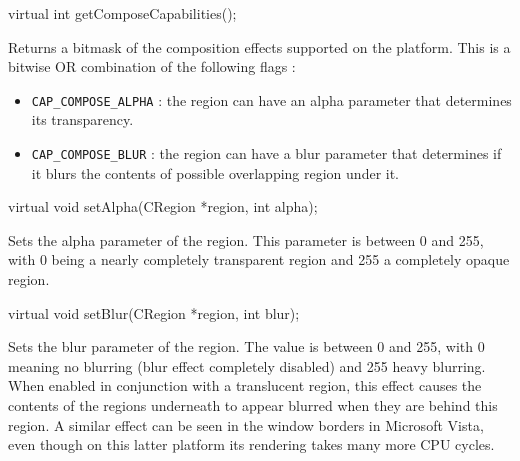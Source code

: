 \documentclass[a4paper,11pt]{journal}
\begin{document}
\begin{verbatimtab}
virtual int getComposeCapabilities();
\end{verbatimtab}
Returns a bitmask of the composition effects supported on the platform. This is a bitwise OR combination of the following flags :
\begin{itemize}[noitemsep,topsep=0mm]
\item \verb!CAP_COMPOSE_ALPHA! : the region can have an alpha parameter that determines its transparency.
\item \verb!CAP_COMPOSE_BLUR! : the region can have a blur parameter that determines if it blurs the contents of possible overlapping region under it.
\end{itemize}

\begin{verbatimtab}virtual void setAlpha(CRegion *region, int alpha);\end{verbatimtab}
Sets the alpha parameter of the region. This parameter is between 0 and 255, with 0 being a nearly completely transparent region and 255 a completely opaque region.\\
\begin{verbatimtab}virtual void setBlur(CRegion *region, int blur);\end{verbatimtab}
Sets the blur parameter of the region. The value is between 0 and 255, with 0 meaning no blurring (blur effect completely disabled) and 255 heavy blurring. When enabled in conjunction with a translucent region, this effect causes the contents of the regions underneath to appear blurred when they are behind this region. A similar effect can be seen in the window borders in Microsoft Vista, even though on this latter platform its rendering takes many more CPU cycles.
\end{document}
